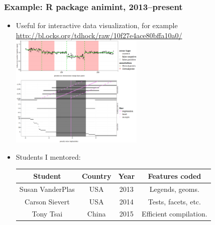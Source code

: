 \documentclass{beamer}
\begin{document}
\begin{frame}[fragile]
\frametitle{Example: R package animint, 2013--present}
\begin{itemize}
  \item Useful for interactive data visualization, for example
    {\small \url{http://bl.ocks.org/tdhock/raw/10f27e4ace80bffa10a0/}}\\
    \includegraphics[width=0.5\textwidth]{screenshot-max-margin-interval-regression}
  \item Students I mentored:
    \begin{tabular}{cccc}
      Student & Country & Year & Features coded \\
      \hline
      Susan VanderPlas & USA & 2013 & Legends, geoms. \\
      Carson Sievert & USA & 2014 & Tests, facets, etc. \\ 
      Tony Tsai & China & 2015 & Efficient compilation.\\
    \end{tabular}
\end{itemize}
\end{frame}
\end{document}
